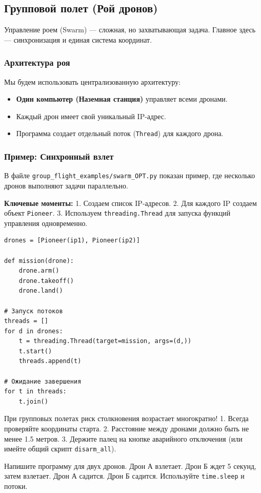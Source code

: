 \subsection{Групповой полет (Рой дронов)}

Управление роем (Swarm) — сложная, но захватывающая задача. Главное здесь — синхронизация и единая система координат.

\subsubsection*{Архитектура роя}
Мы будем использовать централизованную архитектуру:
\begin{itemize}
    \item \textbf{Один компьютер (Наземная станция)} управляет всеми дронами.
    \item Каждый дрон имеет свой уникальный IP-адрес.
    \item Программа создает отдельный поток (\texttt{Thread}) для каждого дрона.
\end{itemize}

\subsubsection*{Пример: Синхронный взлет}
В файле \texttt{group\_flight\_examples/swarm\_OPT.py} показан пример, где несколько дронов выполняют задачи параллельно.

\textbf{Ключевые моменты:}
1. Создаем список IP-адресов.
2. Для каждого IP создаем объект \texttt{Pioneer}.
3. Используем \texttt{threading.Thread} для запуска функций управления одновременно.

\begin{codebox}
\begin{verbatim}
drones = [Pioneer(ip1), Pioneer(ip2)]

def mission(drone):
    drone.arm()
    drone.takeoff()
    drone.land()

# Запуск потоков
threads = []
for d in drones:
    t = threading.Thread(target=mission, args=(d,))
    t.start()
    threads.append(t)

# Ожидание завершения
for t in threads:
    t.join()
\end{verbatim}
\end{codebox}

\begin{warnbox}
При групповых полетах риск столкновения возрастает многократно!
1. Всегда проверяйте координаты старта.
2. Расстояние между дронами должно быть не менее 1.5 метров.
3. Держите палец на кнопке аварийного отключения (или имейте общий скрипт \texttt{disarm\_all}).
\end{warnbox}

\begin{taskbox}[Танец]
Напишите программу для двух дронов.
Дрон А взлетает.
Дрон Б ждет 5 секунд, затем взлетает.
Дрон А садится.
Дрон Б садится.
Используйте \texttt{time.sleep} и потоки.
\end{taskbox}
